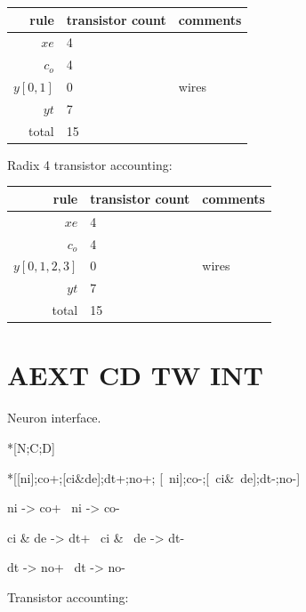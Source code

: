 \documentclass{article}
\begin{document}
\begin{center}
    \begin{tabular}{|r|l|l|}
    \hline
    rule & transistor count & comments \\ \hline
    $xe$ & 4 & \\ \hline
    $c_o$ & 4 & \\ \hline
    $y[0,1]$ & 0 & wires \\ \hline
    $yt$ & 7 & \\ \hline
    \hline total & 15 & \\ \hline
    \end{tabular}
\end{center}

\noindent
Radix 4 transistor accounting:

\begin{center}
    \begin{tabular}{|r|l|l|}
    \hline
    rule & transistor count & comments \\ \hline
    $xe$ & 4 & \\ \hline
    $c_o$ & 4 & \\ \hline
    $y[0,1,2,3]$ & 0 & wires \\ \hline
    $yt$ & 7 & \\ \hline
    \hline total & 15 & \\ \hline
    \end{tabular}
\end{center}

\section{AEXT CD TW INT \label{sec:AEXT_CD_TW_INT}}

Neuron interface.

\begin{csp}
*[N;C;D]
\end{csp}

\begin{hse}
*[[ni];co+;[ci&de];dt+;no+;
  [~ni];co-;[~ci&~de];dt-;no-]
\end{hse}

\begin{prs2}
ni -> co+
~ni -> co-

ci & de -> dt+
~ci & ~de -> dt-

dt -> no+
~dt -> no-
\end{prs2}

\noindent Transistor accounting:
\end{document}
